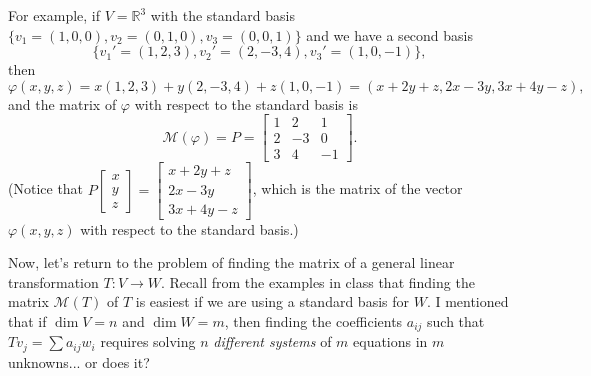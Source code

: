 \documentclass[12pt,letterpaper]{article}
\newcommand{\M}{\mathcal{M}}
\newcommand{\R}{\mathbb{R}}
\begin{document}
For example, if $V=\R^3$ with the standard basis $\{v_1=(1,0,0),v_2=(0,1,0),v_3=(0,0,1)\}$ and we have a second basis 
\[
\{v_1' = (1,2,3), v_2' = (2, -3, 4), v_3' = (1,0,-1)\},
\]
then
\[
\varphi(x,y,z) = x(1,2,3)+y(2,-3,4)+z(1,0,-1) = (x+2y+z,2x-3y, 3x+4y-z),
\]
and the matrix of $\varphi$ with respect to the standard basis is
\[
\M(\varphi) = P = \begin{bmatrix}1&2&1\\2&-3&0\\3&4&-1\end{bmatrix}.
\]
(Notice that $P\begin{bmatrix}x\\y\\z\end{bmatrix} = \begin{bmatrix}x+2y+z\\2x-3y\\3x+4y-z\end{bmatrix}$, which is the matrix of the vector $\varphi(x,y,z)$ with respect to the standard basis.)

Now, let's return to the problem of finding the matrix of a general linear transformation $T:V\to W$. Recall from the examples in class that finding the matrix $\M(T)$ of $T$ is easiest if we are using a standard basis for $W$. I mentioned that if $\dim V = n$ and $\dim W = m$, then finding the coefficients $a_{ij}$ such that $Tv_j = \sum a_{ij}w_i$ requires solving $n$ {\em different systems} of $m$ equations in $m$ unknowns... or does it?
\end{document}
